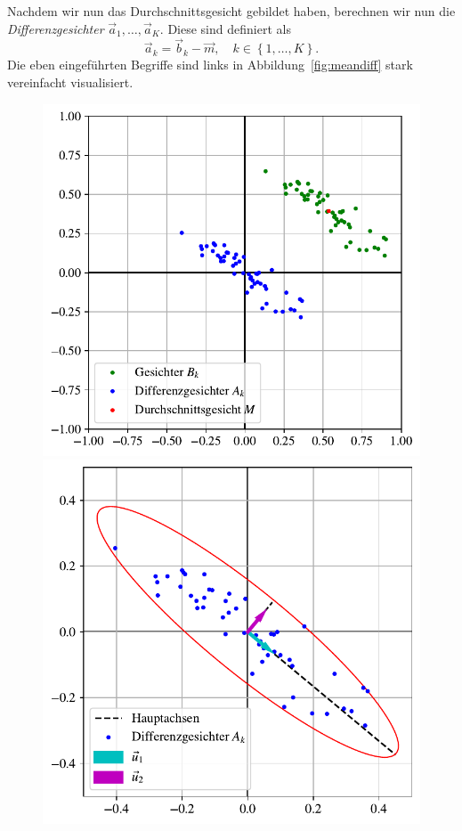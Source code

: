 Nachdem wir nun das Durchschnittsgesicht gebildet haben, berechnen wir nun die \textit{Differenzgesichter} $\vec a_1,\ldots,\vec a_K$.
Diese sind definiert als
\begin{equation*}
	\vec a_k=\vec b_k-\vec m,\quad k\in\left\{1,\ldots,K\right\}.
\end{equation*}
Die eben eingeführten Begriffe sind links in Abbildung~\ref{fig:meandiff} stark vereinfacht visualisiert.
\begin{figure}[ht]
	\centering
	\begin{minipage}{0.5\textwidth}
		\centering
		\includegraphics[width=\textwidth]{images/facespace/meandiff}
	\end{minipage}\hfill
	\begin{minipage}{0.5\textwidth}
		\centering
		\includegraphics[width=\textwidth]{images/facespace/principal_components}

\end{minipage}
\end{figure}
